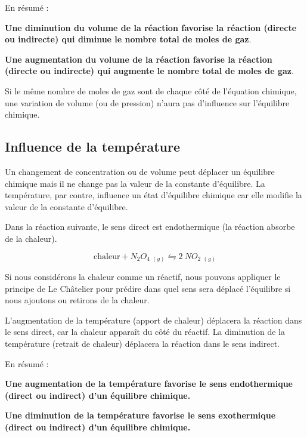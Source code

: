 \documentclass[
  11pt,
  a4paper,
  openany]{book}
\begin{document}
En résumé :

\textbf{Une diminution du volume de la réaction favorise la réaction (directe ou indirecte) qui diminue le nombre total de moles de gaz}.

\textbf{Une augmentation du volume de la réaction favorise la réaction (directe ou indirecte) qui augmente le nombre total de moles de gaz}.

Si le même nombre de moles de gaz sont de chaque côté de l'équation chimique, une variation de volume (ou de pression) n'aura pas d'influence sur l'équilibre chimique.

\hypertarget{influence-de-la-tempuxe9rature}{%
\subsection{Influence de la température}\label{influence-de-la-tempuxe9rature}}

Un changement de concentration ou de volume peut déplacer un équilibre chimique mais il ne change pas la valeur de la constante d'équilibre. La température, par contre, influence un état d'équilibre chimique car elle modifie la valeur de la constante d'équilibre.

Dans la réaction suivante, le sens direct est endothermique (la réaction absorbe de la chaleur).

\[
  \text{chaleur} + N_2O_4\ {}_{(g)} \leftrightharpoons 2\ NO_2\ {}_{(g)}
\]

Si nous considérons la chaleur comme un réactif, nous pouvons appliquer le principe de Le Châtelier pour prédire dans quel sens sera déplacé l'équilibre si nous ajoutons ou retirons de la chaleur.

L'augmentation de la température (apport de chaleur) déplacera la réaction dans le sens direct, car la chaleur apparaît du côté du réactif. La diminution de la température (retrait de chaleur) déplacera la réaction dans le sens indirect.

\clearpage

En résumé :

\textbf{Une augmentation de la température favorise le sens endothermique (direct ou indirect) d'un équilibre chimique.}

\textbf{Une diminution de la température favorise le sens exothermique (direct ou indirect) d'un équilibre chimique.}
\end{document}
